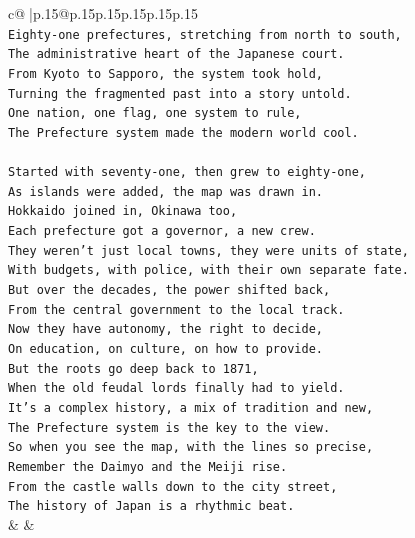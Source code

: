 \documentclass{article}
\begin{document}
{\begin{supertabular}{c@{$\;$}|p{.15\linewidth}@{}p{.15\linewidth}p{.15\linewidth}p{.15\linewidth}p{.15\linewidth}p{.15\linewidth}}
{{{\\ 
\texttt{Eighty{-}one prefectures, stretching from north to south,} \\
\texttt{The administrative heart of the Japanese court.} \\
\texttt{From Kyoto to Sapporo, the system took hold,} \\
\texttt{Turning the fragmented past into a story untold.} \\
\texttt{One nation, one flag, one system to rule,} \\
\texttt{The Prefecture system made the modern world cool.} \\
\\ 
\texttt{Started with seventy{-}one, then grew to eighty{-}one,} \\
\texttt{As islands were added, the map was drawn in.} \\
\texttt{Hokkaido joined in, Okinawa too,} \\
\texttt{Each prefecture got a governor, a new crew.} \\
\texttt{They weren't just local towns, they were units of state,} \\
\texttt{With budgets, with police, with their own separate fate.} \\
\texttt{But over the decades, the power shifted back,} \\
\texttt{From the central government to the local track.} \\
\texttt{Now they have autonomy, the right to decide,} \\
\texttt{On education, on culture, on how to provide.} \\
\texttt{But the roots go deep back to 1871,} \\
\texttt{When the old feudal lords finally had to yield.} \\
\texttt{It's a complex history, a mix of tradition and new,} \\
\texttt{The Prefecture system is the key to the view.} \\
\texttt{So when you see the map, with the lines so precise,} \\
\texttt{Remember the Daimyo and the Meiji rise.} \\
\texttt{From the castle walls down to the city street,} \\
\texttt{The history of Japan is a rhythmic beat.} \\
            }
        }
    }
    & & \\ \\


\end{supertabular}}
\end{document}
